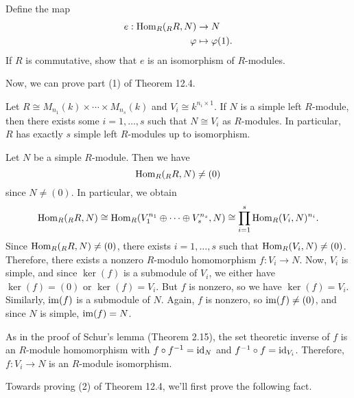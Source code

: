 \begin{exercise}
    Define the map 
    \begin{align*} 
        e : \operatorname{Hom}_R({}_R R, N) &\to N \\ \varphi &\mapsto \varphi(1). 
    \end{align*}
    If $R$ is commutative, show that $e$ is an isomorphism of $R$-modules. 
\end{exercise}

Now, we can prove part (1) of Theorem 12.4. 

\begin{thm}
    Let $R \cong M_{n_1}(k) \times \cdots \times M_{n_s}(k)$ and $V_i 
    \cong k^{n_i \times 1}$. If $N$ is a simple left $R$-module, then there 
    exists some $i = 1, \dots, s$ such that $N \cong V_i$ as $R$-modules. 
    In particular, $R$ has exactly $s$ simple left $R$-modules up to 
    isomorphism. 
\end{thm}
\begin{pf}
    Let $N$ be a simple $R$-module. Then we have 
    \[ \operatorname{Hom}_R({}_R R, N) \neq (0) \] 
    since $N \neq (0)$. In particular, we obtain 
    \[ \operatorname{Hom}_R({}_R R, N) \cong \operatorname{Hom}_R(V_1^{n_1} \oplus \cdots \oplus V_s^{n_s}, 
    N) \cong \prod_{i=1}^s \operatorname{Hom}_R(V_i, N)^{n_i}. \] 
    Since $\operatorname{Hom}_R({}_R R, N) \neq (0)$, there exists $i = 1, \dots, s$ 
    such that $\operatorname{Hom}_R(V_i, N) \neq (0)$. Therefore, there exists a 
    nonzero $R$-modulo homomorphism $f : V_i \to N$. Now, $V_i$ is simple, 
    and since $\ker(f)$ is a submodule of $V_i$, we either have $\ker(f) 
    = (0)$ or $\ker(f) = V_i$. But $f$ is nonzero, so we have $\ker(f) = V_i$. 
    Similarly, $\operatorname{im}(f)$ is a submodule of $N$. Again, $f$ is nonzero, so 
    $\operatorname{im}(f) \neq (0)$, and since $N$ is simple, $\operatorname{im}(f) = N$. 

    As in the proof of Schur's lemma (Theorem 2.15), the set theoretic 
    inverse of $f$ is an $R$-module homomorphism with $f \circ f^{-1} 
    = \operatorname{id}_N$ and $f^{-1} \circ f = \operatorname{id}_{V_i}$. Therefore, $f : V_i \to N$ is 
    an $R$-module isomorphism. 
\end{pf}

Towards proving (2) of Theorem 12.4, we'll first prove the following fact. 

